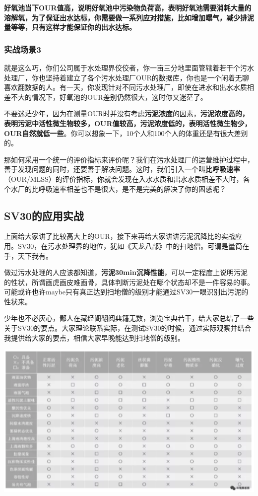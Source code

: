 \documentclass[]{book}
\begin{document}
\textbf{好氧池当下OUR值高，说明好氧池中污染物负荷高，表明好氧池需要消耗大量的溶解氧，为了保证出水达标，你需要做一系列应对措施，比如增加曝气，减少排泥量等等，只有这样才能保证你的出水达标。}

\subsubsection{实战场景3}\label{3}

就是这么巧，你们公司属于水处理界佼佼者，你一亩三分地里面管辖着若干个污水处理厂，你也坚持着建立了各个污水处理厂OUR的数据库，你也是一个闲着无聊喜欢翻数据的人。有一天，你发现针对不同污水处理厂，即使在进水和出水水质相差不大的情况下，好氧池的OUR差别仍然很大，这时你又迷茫了。

不要迷茫少年，因为在测量OUR时并没有考虑\textbf{污泥浓度}的因素，\textbf{污泥浓度高的，表明污泥中活性微生物较多，OUR值较高，污泥浓度低的，表明活性微生物少，OUR自然就低一些}。你可以想象一下，10个人和100个人的体重还是有很大差别的。

那如何采用一个统一的评价指标来评价呢？我们在污水处理厂的运营维护过程中，善于发现问题的同时，还要善于解决问题。这时，我们引入一个叫\textbf{比呼吸速率}（OUR/MLSS）的评价指标，你就会发现在入水水质和出水水质相差不大时，各个水厂的比呼吸速率相差也不是很大，是不是完美的解决了你的困惑呢？

\subsection{SV30的应用实战}\label{sv30}

上面给大家讲了比较高大上的OUR，接下来再给大家讲讲污泥沉降比的实战应用。SV30，在污水处理界的地位，犹如《天龙八部》中的扫地僧。可谓是量筒在手，天下我有。

做过污水处理的人应该都知道，\textbf{污泥30min沉降性能}，可以一定程度上说明污泥的性状，所谓画虎画皮难画骨，具体判断污泥处在哪个状态却不是一件容易的事。可能或许也许maybe只有真正达到扫地僧的级别才能通过SV30一眼识别出污泥的性状来。

少年也不必灰心，鄙人在藏经阁翻阅典籍无数，浏览宝典若干，给大家总结了一些关于SV30的要点。大家理论联系实际，在测试SV30的时候，通过实际观察并结合我提供给大家的要点，相信大家早晚能达到扫地僧的级别。

\includegraphics[width=6.67in]{images/os3}
\end{document}
